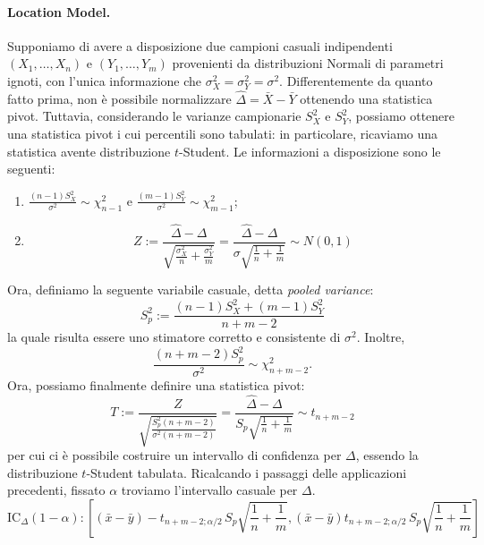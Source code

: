 \paragraph{Location Model.} Supponiamo di avere a disposizione due campioni casuali indipendenti \((X_1,\dotsc,X_n)\) e \((Y_1,\dotsc,Y_m)\) provenienti da distribuzioni Normali di parametri ignoti, con l'unica informazione che \(\sigma_X^2 = \sigma_Y^2 = \sigma^2\). Differentemente da quanto fatto prima, non è possibile normalizzare \(\hat{\Delta} = \bar{X} - \bar{Y}\) ottenendo una statistica pivot.
Tuttavia, considerando le varianze campionarie \(S_X^2\) e \(S_Y^2\), possiamo ottenere una statistica pivot i cui percentili sono tabulati: in particolare, ricaviamo una statistica avente distribuzione \(t\)-Student.
Le informazioni a disposizione sono le seguenti:
\begin{enumerate}
  \item \(\frac{(n-1)S_X^2}{\sigma^2} \sim \chi_{n-1}^2\) e
  \(\frac{(m-1)S_Y^2}{\sigma^2} \sim \chi_{m-1}^2\);
  \item
  \begin{equation*}
    Z := \frac{\hat{\Delta}-\Delta}{\sqrt{\frac{\sigma_X^2}{n} + \frac{\sigma_Y^2}{m}}}
    = \frac{\hat{\Delta} - \Delta}{\sigma\sqrt{\frac{1}{n}+\frac{1}{m}}}
    \sim N(0,1)
  \end{equation*}
\end{enumerate}
Ora, definiamo la seguente variabile casuale, detta \emph{pooled variance}:
\begin{equation}
  S_p^2 := \frac{(n - 1)S_X^2 + (m - 1)S_Y^2}{n + m - 2}
\end{equation}
la quale risulta essere uno stimatore corretto e consistente di \(\sigma^2\). Inoltre,
\begin{equation*}
  \frac{(n+m-2)S_p^2}{\sigma^2} \sim \chi_{n+m-2}^2.
\end{equation*}
Ora, possiamo finalmente definire una statistica pivot:
\begin{equation}
  T := \frac{Z}{\sqrt{\frac{S_p^2(n+m-2)}{\sigma^2(n+m-2)}}} =
  \frac{\hat{\Delta}-\Delta}{S_p\sqrt{\frac{1}{n} + \frac{1}{m}}}
  \sim t_{n+m-2}
\end{equation}
per cui ci è possibile costruire un intervallo di confidenza per \(\Delta\), essendo la distribuzione \(t\)-Student tabulata.
Ricalcando i passaggi delle applicazioni precedenti, fissato $\alpha$  troviamo l'intervallo casuale per $\Delta$.
\begin{equation}
  \mathrm{IC}_{\Delta}(1-\alpha) \colon
  \left[(\bar{x} - \bar{y}) - t_{n+m-2;\alpha/2}\, S_p\sqrt{ \frac{1}{n} + \frac{1}{m}},(\bar{x} - \bar{y}) t_{n+m-2;\alpha/2}\, S_p\sqrt{ \frac{1}{n} + \frac{1}{m}}\right]
\end{equation}


